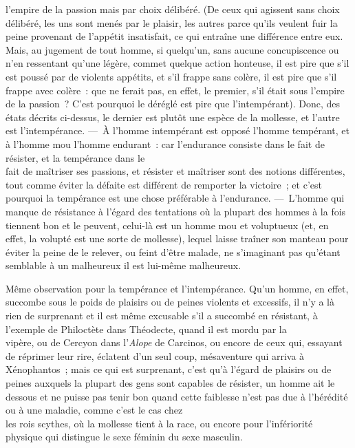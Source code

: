 \documentclass[french,twoside]{book} %
\begin{document}
l’empire de la passion mais par choix délibéré. (De ceux qui agissent sans choix délibéré, les uns sont menés par le plaisir, les autres parce qu’ils veulent fuir la peine provenant de l’appétit insatisfait, ce qui entraîne une différence entre eux. Mais, au jugement de tout homme, si quelqu’un, sans aucune concupiscence ou n’en ressentant qu’une légère, commet quelque action honteuse, il est pire que s’il est poussé par de violents appétits, et s’il frappe sans colère, il est pire que s’il \\
frappe avec colère : que ne ferait pas, en effet, le premier, s’il était sous l’empire de la passion ? C’est pourquoi le déréglé est pire que l’intempérant). Donc, des états décrits ci-dessus, le dernier est plutôt une espèce de la mollesse, et l’autre est l’intempérance. — À l’homme intempérant est opposé l’homme tempérant, et à l’homme mou l’homme endurant : car l’endurance consiste dans le fait de résister, et la tempérance dans le \\
fait de maîtriser ses passions, et résister et maîtriser sont des notions différentes, tout comme éviter la défaite est différent de remporter la victoire ; et c’est pourquoi la tempérance est  une chose préférable à l’endurance. — L’homme qui manque de résistance à l’égard des tentations où la plupart des hommes à la fois tiennent bon et le peuvent, celui-là est un homme mou et voluptueux (et, en effet, la volupté est une sorte de mollesse), lequel laisse traîner son manteau pour éviter la peine de le relever, ou feint d’être malade, ne s’imaginant pas qu’étant \\
semblable à un malheureux il est lui-même malheureux.\par
Même observation pour la tempérance et l’intempérance. Qu’un homme, en effet, succombe sous le poids de plaisirs ou de peines violents et excessifs, il n’y a là rien de surprenant et il est même excusable s’il a succombé en résistant, à l’exemple de Philoctète dans Théodecte, quand il est mordu par la \\
vipère, ou de Cercyon dans l’{\itshape Alope} de Carcinos, ou encore de ceux qui, essayant de réprimer leur rire, éclatent d’un seul coup, mésaventure qui arriva à Xénophantos ; mais ce qui est surprenant, c’est qu’à l’égard de plaisirs ou de peines auxquels la plupart des gens sont capables de résister, un homme ait le dessous et ne puisse pas tenir bon quand cette faiblesse n’est pas due à l’hérédité ou à une maladie, comme c’est le cas chez \\
les rois scythes, où la mollesse tient à la race, ou encore pour l’infériorité physique qui distingue le sexe féminin du sexe masculin.\par
\end{document}

